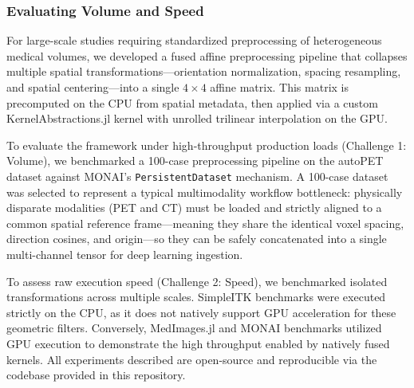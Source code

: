 \documentclass[10pt,letterpaper]{article}
\begin{document}
\subsubsection*{Evaluating Volume and Speed}
For large-scale studies requiring standardized preprocessing of heterogeneous medical volumes, we developed a fused affine preprocessing pipeline that collapses multiple spatial transformations---orientation normalization, spacing resampling, and spatial centering---into a single $4 \times 4$ affine matrix. This matrix is precomputed on the CPU from spatial metadata, then applied via a custom KernelAbstractions.jl kernel with unrolled trilinear interpolation on the GPU.

To evaluate the framework under high-throughput production loads (Challenge 1: Volume), we benchmarked a 100-case preprocessing pipeline on the autoPET dataset \cite{Dexl_2025} against MONAI's \texttt{PersistentDataset} mechanism. A 100-case dataset was selected to represent a typical multimodality workflow bottleneck: physically disparate modalities (PET and CT) must be loaded and strictly aligned to a common spatial reference frame---meaning they share the identical voxel spacing, direction cosines, and origin---so they can be safely concatenated into a single multi-channel tensor for deep learning ingestion. 

To assess raw execution speed (Challenge 2: Speed), we benchmarked isolated transformations across multiple scales. SimpleITK benchmarks were executed strictly on the CPU, as it does not natively support GPU acceleration for these geometric filters. Conversely, MedImages.jl and MONAI benchmarks utilized GPU execution to demonstrate the high throughput enabled by natively fused kernels. All experiments described are open-source and reproducible via the codebase provided in this repository.
\end{document}
